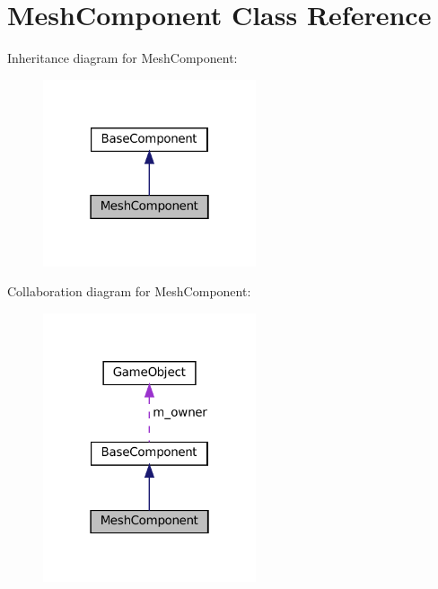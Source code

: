 \hypertarget{classMeshComponent}{}\section{Mesh\+Component Class Reference}
\label{classMeshComponent}


Inheritance diagram for Mesh\+Component\+:\nopagebreak
\begin{figure}[H]
\begin{center}
\leavevmode
\includegraphics[width=178pt]{classMeshComponent__inherit__graph}
\end{center}
\end{figure}


Collaboration diagram for Mesh\+Component\+:\nopagebreak
\begin{figure}[H]
\begin{center}
\leavevmode
\includegraphics[width=178pt]{classMeshComponent__coll__graph}
\end{center}
\end{figure}

